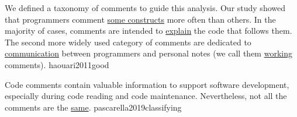 \documentclass{article}
\begin{document}
  {We defined a taxonomy of comments to guide this analysis. Our study showed that programmers comment \ul{some constructs} more often than others. In the majority of cases, comments are intended to \ul{explain} the code that follows them. The second more widely used category of comments are dedicated to \ul{communication} between programmers and personal notes (we call them \ul{working} comments).}
  {haouari2011good}

  {Code comments contain valuable information to support software development, especially during code reading and code maintenance. Nevertheless, not all the comments are the \ul{same}.}
  {pascarella2019classifying}
\end{document}
